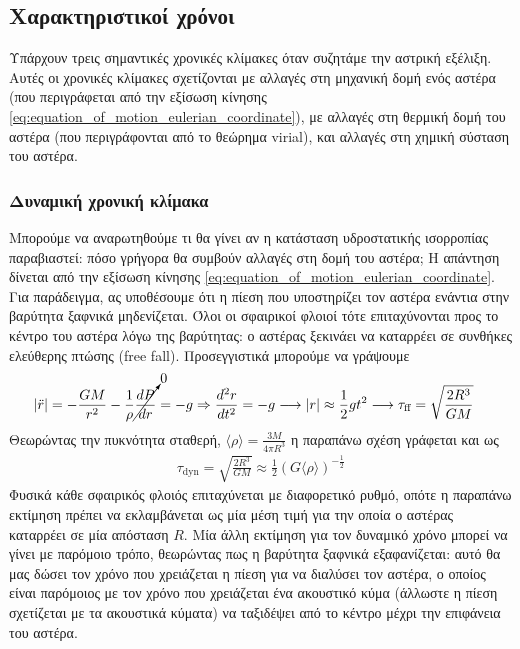 \subsection{Χαρακτηριστικοί χρόνοι}
Υπάρχουν τρεις σημαντικές χρονικές κλίμακες όταν συζητάμε την αστρική εξέλιξη. Αυτές οι χρονικές κλίμακες σχετίζονται με αλλαγές στη μηχανική δομή ενός αστέρα (που περιγράφεται από την εξίσωση κίνησης \eqref{eq:equation_of_motion_eulerian_coordinate}), με αλλαγές στη θερμική δομή του αστέρα (που περιγράφονται από το θεώρημα virial), και αλλαγές στη χημική σύσταση του αστέρα.
\subsubsection{Δυναμική χρονική κλίμακα}
Μπορούμε να αναρωτηθούμε τι θα γίνει αν η κατάσταση υδροστατικής ισορροπίας παραβιαστεί: πόσο γρήγορα θα συμβούν αλλαγές στη δομή του αστέρα; Η απάντηση δίνεται από την εξίσωση κίνησης \eqref{eq:equation_of_motion_eulerian_coordinate}. Για παράδειγμα, ας υποθέσουμε ότι η πίεση που υποστηρίζει τον αστέρα ενάντια στην βαρύτητα ξαφνικά μηδενίζεται. Όλοι οι σφαιρικοί φλοιοί τότε επιταχύνονται προς το κέντρο του αστέρα λόγω της βαρύτητας: ο αστέρας ξεκινάει να καταρρέει σε συνθήκες ελεύθερης πτώσης (free fall). Προσεγγιστικά μπορούμε να γράψουμε
\begin{align*}
    \left| \ddot{r} \right| &= - \frac{GM}{r^2} - \frac{1}{\rho} \cancelto{0}{\frac{dP}{dr}} = - g 
    \Rightarrow \frac{d^2r}{dt^2} = -g \longrightarrow \left| r \right| \approx \frac{1}{2} gt^2 
    \longrightarrow \tau_{\text{ff}} = \sqrt{\frac{2R^3}{GM}}
\end{align*}
Θεωρώντας την πυκνότητα σταθερή, $\langle \rho \rangle = \frac{3M}{4\pi R^3}$ η παραπάνω σχέση γράφεται και ως
\begin{eqnarray}
    \label{eq:dynamic_timescale}
    \tau_{\text{dyn}} = \sqrt{\frac{2R^3}{GM}} \approx  \frac{1}{2} (G \langle \rho \rangle)^{- \frac{1}{2}}
\end{eqnarray}
Φυσικά κάθε σφαιρικός φλοιός επιταχύνεται με διαφορετικό ρυθμό, οπότε η παραπάνω εκτίμηση πρέπει να εκλαμβάνεται ως μία μέση τιμή για την οποία ο αστέρας καταρρέει σε μία απόσταση $R$. Μία άλλη εκτίμηση για τον δυναμικό χρόνο μπορεί να γίνει με παρόμοιο τρόπο, θεωρώντας πως η βαρύτητα ξαφνικά εξαφανίζεται: αυτό θα μας δώσει τον χρόνο που χρειάζεται η πίεση για να διαλύσει τον αστέρα, ο οποίος είναι παρόμοιος με τον χρόνο που χρειάζεται ένα ακουστικό κύμα (άλλωστε η πίεση σχετίζεται με τα ακουστικά κύματα) να ταξιδέψει από το κέντρο μέχρι την επιφάνεια του αστέρα.

